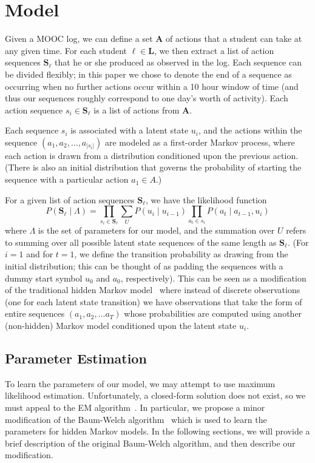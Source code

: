 \section{Model}

Given a MOOC log, we can define a set $\mathbf{A}$ of actions that a
student can take at any given time. For each student $\ell \in \mathbf{L}$,
we then extract a list of action sequences $\mathbf{S}_\ell$ that he or she
produced as observed in the log. Each sequence can be divided flexibly; in
this paper we chose to denote the end of a sequence as occurring when no
further actions occur within a 10 hour window of time (and thus our
sequences roughly correspond to one day's worth of activity). Each action
sequence $s_i \in \mathbf{S}_\ell$ is a list of actions from $\mathbf{A}$.

Each sequence $s_i$ is associated with a latent state $u_i$, and the
actions within the sequence $(a_1, a_2, \ldots, a_{|s_i|})$ are modeled as
a first-order Markov process, where each action is drawn from a
distribution conditioned upon the previous action. (There is also an initial
distribution that governs the probability of starting the sequence with a
particular action $a_1 \in A$.)

For a given list of action sequences $\mathbf{S}_\ell$, we have the
likelihood function
\begin{equation}
  P(\mathbf{S}_\ell \mid \Lambda)
  = \prod_{s_i \in \mathbf{S}_\ell}
  \sum_{U} P(u_i \mid u_{i-1})
  \prod_{a_t \in s_i}
  P(a_t \mid a_{t-1}, u_i)
\end{equation}
where $\Lambda$ is the set of parameters for our model, and the summation
over $U$ refers to summing over all possible latent state sequences of the
same length as $\mathbf{S}_\ell$. (For $i=1$ and for $t=1$, we define the
transition probability as drawing from the initial distribution; this can
be thought of as padding the sequences with a dummy start symbol $u_0$ and
$a_0$, respectively). This can be seen as a modification of the traditional
hidden Markov model~\cite{Rabiner:1990:RSR} where instead of discrete
observations (one for each latent state transition) we have observations
that take the form of entire sequences $(a_1, a_2, \ldots a_T)$ whose
probabilities are computed using another (non-hidden) Markov model
conditioned upon the latent state $u_i$.

\subsection{Parameter Estimation}
To learn the parameters of our model, we may attempt to use maximum
likelihood estimation. Unfortunately, a closed-form solution does not
exist, so we must appeal to the EM algorithm~\cite{Dempster:1977:JRSS}. In
particular, we propose a minor modification of the Baum-Welch
algorithm~\cite{Rabiner:1990:RSR} which is used to learn the parameters for
hidden Markov models. In the following sections, we will provide a brief
description of the original Baum-Welch algorithm, and then describe our
modification.

